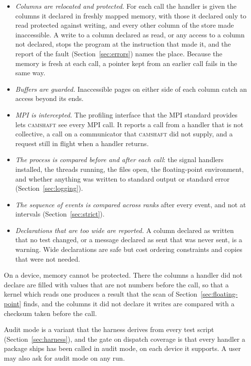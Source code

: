 \documentclass[11pt,a4paper]{article}
\newcommand{\camshaft}{\textsc{camshaft}}
\begin{document}
\begin{itemize}
  \item \emph{Columns are relocated and protected.}  For each call the
        handler is given the columns it declared in freshly mapped memory,
        with those it declared only to read protected against writing, and
        every other column of the store made inaccessible.  A write to a
        column declared as read, or any access to a column not declared,
        stops the program at the instruction that made it, and the report
        of the fault (Section~\ref{sec:errors}) names the place.  Because
        the memory is fresh at each call, a pointer kept from an earlier
        call fails in the same way.
  \item \emph{Buffers are guarded.}  Inaccessible pages on either side of
        each column catch an access beyond its ends.
  \item \emph{MPI is intercepted.}  The profiling interface that the MPI
        standard provides~\cite{mpi50} lets \camshaft{} see every MPI call.
        It reports a call from a handler that is not collective, a call on a
        communicator that \camshaft{} did not supply, and a request still
        in flight when a handler returns.
  \item \emph{The process is compared before and after each call}: the
        signal handlers installed, the threads running, the files open, the
        floating-point environment, and whether anything was written to
        standard output or standard error (Section~\ref{sec:logging}).
  \item \emph{The sequence of events is compared across ranks} after every
        event, and not at intervals (Section~\ref{sec:strict}).
  \item \emph{Declarations that are too wide are reported.}  A column
        declared as written that no test changed, or a message declared as
        sent that was never sent, is a warning.  Wide declarations are safe
        but cost ordering constraints and copies that were not needed.
\end{itemize}

On a device, memory cannot be protected.  There the columns a handler did
not declare are filled with values that are not numbers before the call, so
that a kernel which reads one produces a result that the scan of
Section~\ref{sec:floating-point} finds, and the columns it did not declare
it writes are compared with a checksum taken before the call.

Audit mode is a variant that the harness derives from every test script
(Section~\ref{sec:harness}), and the gate on dispatch coverage is that every
handler a package ships has been called in audit mode, on each device it
supports.  A user may also ask for audit mode on any run.
\end{document}
